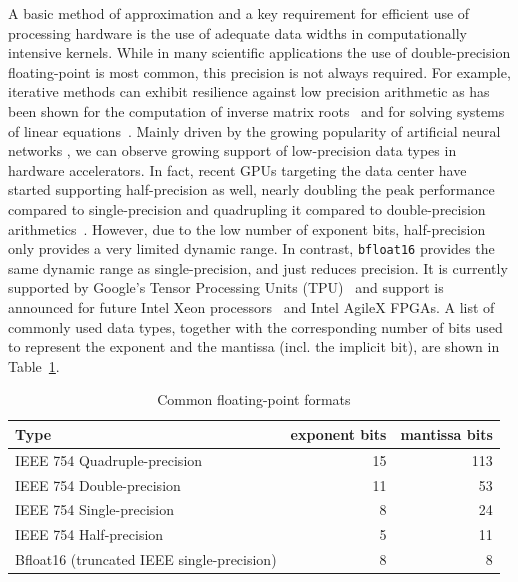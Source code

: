 \documentclass[format=acmsmall,review,timestamp,urlbreakonhyphens]{acmart}
\begin{document}
A basic method of approximation and a key requirement for efficient use of processing hardware is the use of adequate data widths in computationally intensive kernels. While in many scientific applications the use of double-precision floating-point is most common, this precision is not always required.
For example, iterative methods can exhibit resilience against low precision arithmetic as has been shown for the computation of inverse matrix roots~\cite{lass17-esl} and for solving systems of linear equations~\cite{KlavikMalossiBekasEtAl2014,Bekas,Dongarra2017,Dongarra2018}.
Mainly driven by the growing popularity of artificial neural networks \cite{Gupta2015}, we can observe growing support of low-precision data types %
in hardware accelerators.
%
In fact, recent GPUs targeting the data center have started supporting half-precision as well, nearly doubling the peak performance compared to single-precision and quadrupling it compared to double-precision arithmetics~\cite{tesla}. However, due to the low number of exponent bits, half-precision only provides a very limited dynamic range. In contrast, \texttt{bfloat16} provides the same dynamic range as single-precision, and just reduces precision. It is currently supported by Google's Tensor Processing Units (TPU)~\cite{tpu} and support is announced for future Intel Xeon processors~\cite{xeon} and Intel AgileX FPGAs. A list of commonly used data types, together with the corresponding number of bits used to represent the exponent and the mantissa (incl. the implicit bit), are shown in Table~\ref{tab:float}.
\begin{table}
  \caption{Common floating-point formats}
  \label{tab:float}
  \begin{tabular}{lrr}
    Type & exponent bits & mantissa bits \\
    \hline
    IEEE 754 Quadruple-precision & 15 & 113 \\
    IEEE 754 Double-precision & 11 & 53 \\
    IEEE 754 Single-precision & 8 & 24 \\
    IEEE 754 Half-precision & 5 & 11 \\
    Bfloat16 (truncated IEEE single-precision)& 8 & 8
  \end{tabular}
\end{table}
\end{document}
